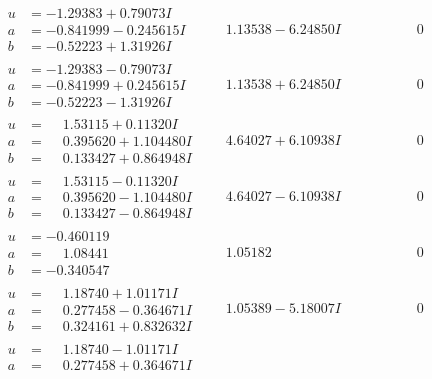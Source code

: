\documentclass[1p]{elsarticle_modified}
\theoremstyle{definition}
\begin{document}
$$\begin{array}{c|c|c}
\begin{aligned}
u &= -1.29383 + 0.79073 I \\
a &= -0.841999 - 0.245615 I \\
b &= -0.52223 + 1.31926 I\end{aligned}
 & \phantom{-}1.13538 - 6.24850 I & \phantom{-0.000000 } 0 \\ \hline\begin{aligned}
u &= -1.29383 - 0.79073 I \\
a &= -0.841999 + 0.245615 I \\
b &= -0.52223 - 1.31926 I\end{aligned}
 & \phantom{-}1.13538 + 6.24850 I & \phantom{-0.000000 } 0 \\ \hline\begin{aligned}
u &= \phantom{-}1.53115 + 0.11320 I \\
a &= \phantom{-}0.395620 + 1.104480 I \\
b &= \phantom{-}0.133427 + 0.864948 I\end{aligned}
 & \phantom{-}4.64027 + 6.10938 I & \phantom{-0.000000 } 0 \\ \hline\begin{aligned}
u &= \phantom{-}1.53115 - 0.11320 I \\
a &= \phantom{-}0.395620 - 1.104480 I \\
b &= \phantom{-}0.133427 - 0.864948 I\end{aligned}
 & \phantom{-}4.64027 - 6.10938 I & \phantom{-0.000000 } 0 \\ \hline\begin{aligned}
u &= -0.460119\phantom{ +0.000000I} \\
a &= \phantom{-}1.08441\phantom{ +0.000000I} \\
b &= -0.340547\phantom{ +0.000000I}\end{aligned}
 & \phantom{-}1.05182\phantom{ +0.000000I} & \phantom{-0.000000 } 0 \\ \hline\begin{aligned}
u &= \phantom{-}1.18740 + 1.01171 I \\
a &= \phantom{-}0.277458 - 0.364671 I \\
b &= \phantom{-}0.324161 + 0.832632 I\end{aligned}
 & \phantom{-}1.05389 - 5.18007 I & \phantom{-0.000000 } 0 \\ \hline\begin{aligned}
u &= \phantom{-}1.18740 - 1.01171 I \\
a &= \phantom{-}0.277458 + 0.364671 I \\

\end{aligned}
\end{array}$$
\end{document}
